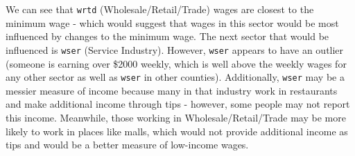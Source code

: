 \documentclass[]{article}
\newenvironment{Shaded}{\begin{snugshade}}{\end{snugshade}}
\newcommand{\CommentTok}[1]{\textcolor[rgb]{0.56,0.35,0.01}{\textit{#1}}}
\newcommand{\DataTypeTok}[1]{\textcolor[rgb]{0.13,0.29,0.53}{#1}}
\newcommand{\KeywordTok}[1]{\textcolor[rgb]{0.13,0.29,0.53}{\textbf{#1}}}
\newcommand{\NormalTok}[1]{#1}
\newcommand{\OperatorTok}[1]{\textcolor[rgb]{0.81,0.36,0.00}{\textbf{#1}}}
\newcommand{\StringTok}[1]{\textcolor[rgb]{0.31,0.60,0.02}{#1}}
\begin{document}
We can see that \texttt{wrtd} (Wholesale/Retail/Trade) wages are closest
to the minimum wage - which would suggest that wages in this sector
would be most influenced by changes to the minimum wage. The next sector
that would be influenced is \texttt{wser} (Service Industry). However,
\texttt{wser} appears to have an outlier (someone is earning over \$2000
weekly, which is well above the weekly wages for any other sector as
well as \texttt{wser} in other counties). Additionally, \texttt{wser}
may be a messier measure of income because many in that industry work in
restaurants and make additional income through tips - however, some
people may not report this income. Meanwhile, those working in
Wholesale/Retail/Trade may be more likely to work in places like malls,
which would not provide additional income as tips and would be a better
measure of low-income wages.

\begin{Shaded}
\end{Shaded}
\end{document}
